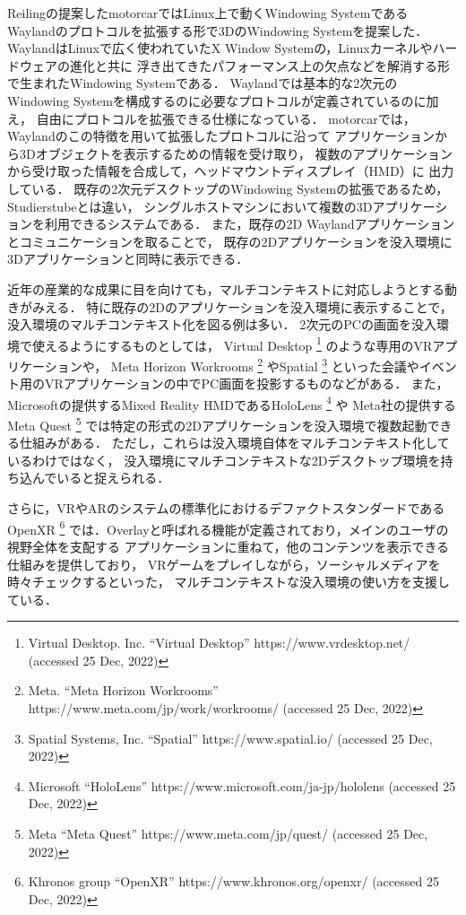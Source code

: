 Reilingの提案したmotorcar\cite{reiling}ではLinux上で動くWindowing Systemである
Waylandのプロトコルを拡張する形で3DのWindowing Systemを提案した．
WaylandはLinuxで広く使われていたX Window Systemの，Linuxカーネルやハードウェアの進化と共に
浮き出てきたパフォーマンス上の欠点などを解消する形で生まれたWindowing Systemである．
Waylandでは基本的な2次元のWindowing Systemを構成するのに必要なプロトコルが定義されているのに加え，
自由にプロトコルを拡張できる仕様になっている．
motorcarでは，Waylandのこの特徴を用いて拡張したプロトコルに沿って
アプリケーションから3Dオブジェクトを表示するための情報を受け取り，
複数のアプリケーションから受け取った情報を合成して，ヘッドマウントディスプレイ（HMD）に
出力している．
既存の2次元デスクトップのWindowing Systemの拡張であるため，Studierstubeとは違い，
シングルホストマシンにおいて複数の3Dアプリケーションを利用できるシステムである．
また，既存の2D Waylandアプリケーションとコミュニケーションを取ることで，
既存の2Dアプリケーションを没入環境に3Dアプリケーションと同時に表示できる．

近年の産業的な成果に目を向けても，マルチコンテキストに対応しようとする動きがみえる．
特に既存の2Dのアプリケーションを没入環境に表示することで，
没入環境のマルチコンテキスト化を図る例は多い．
2次元のPCの画面を没入環境で使えるようにするものとしては，
Virtual Desktop
\footnote{Virtual Desktop. Inc. ``Virtual Desktop'' https://www.vrdesktop.net/ (accessed 25 Dec, 2022)}
のような専用のVRアプリケーションや，
Meta Horizon Workrooms
\footnote{Meta. ``Meta Horizon Workrooms'' https://www.meta.com/jp/work/workrooms/ (accessed 25 Dec, 2022)}
やSpatial
\footnote{Spatial Systems, Inc. ``Spatial'' https://www.spatial.io/ (accessed 25 Dec, 2022)}
といった会議やイベント用のVRアプリケーションの中でPC画面を投影するものなどがある．
また，Microsoftの提供するMixed Reality HMDであるHoloLens
\footnote{Microsoft ``HoloLens'' https://www.microsoft.com/ja-jp/hololens (accessed 25 Dec, 2022)}
や Meta社の提供するMeta Quest
\footnote{Meta ``Meta Quest'' https://www.meta.com/jp/quest/ (accessed 25 Dec, 2022)}
では特定の形式の2Dアプリケーションを没入環境で複数起動できる仕組みがある．
ただし，これらは没入環境自体をマルチコンテキスト化しているわけではなく，
没入環境にマルチコンテキストな2Dデスクトップ環境を持ち込んでいると捉えられる．

さらに，VRやARのシステムの標準化におけるデファクトスタンダードであるOpenXR
\footnote{Khronos group ``OpenXR'' https://www.khronos.org/openxr/ (accessed 25 Dec, 2022)}
では．Overlayと呼ばれる機能が定義されており，メインのユーザの視野全体を支配する
アプリケーションに重ねて，他のコンテンツを表示できる仕組みを提供しており，
VRゲームをプレイしながら，ソーシャルメディアを時々チェックするといった，
マルチコンテキストな没入環境の使い方を支援している．

